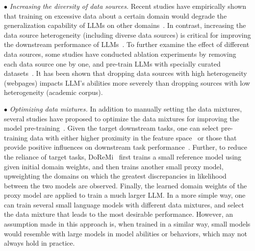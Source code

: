 {{$\bullet$ \emph{Increasing the diversity of data sources.}
Recent studies have empirically shown that training on excessive data about a certain domain would degrade the generalization capability of LLMs on other domains~\cite{Taylor-arxiv-2022-Galactica,Rae-arxiv-2021-Scaling}. In contrast, increasing the data source heterogeneity (\eg  including diverse data sources) is critical for improving the downstream performance of LLMs~\cite{Longpre-arxiv-2023-pretrainer,Tirumala-2023-arXiv-D4,Shen-2023-arXiv-SlimPajamaDC}. 
To further examine the effect of different data sources, some studies  have conducted ablation experiments by removing  each data source one by one,  and pre-train LLMs with specially curated datasets~\cite{Longpre-arxiv-2023-pretrainer}. It has been shown  that dropping data sources with high heterogeneity (\eg webpages) impacts LLM's abilities more severely than dropping sources with low heterogeneity (\eg academic corpus).
}

{$\bullet$ \emph{Optimizing data mixtures.}
In addition to manually setting the data mixtures, several studies have proposed to optimize the data mixtures for improving the model pre-training~\cite{Xie-arxiv-2023-DSIR,Xie-arxiv-2023-doremi}. Given the target downstream tasks, one can select pre-training data with either higher proximity in the feature space~\cite{Xie-arxiv-2023-DSIR} or those that provide positive influences on downstream  task performance~\cite{Wang-2023-arXiv-farewell}. %
Further, to reduce the reliance of target tasks, DoReMi~\cite{Xie-arxiv-2023-doremi} %
 first trains a small reference model using   given initial domain weights, and then trains another small proxy model, upweighting the domains   on which the greatest discrepancies in  likelihood between the two models are observed. Finally, the learned  domain weights of the proxy model are applied to train a much larger LLM.} 
In a more simple way, one can train several small  language models with different data mixtures, and select the data mixture that leads to  the most desirable performance.
However, an assumption made in this  approach is,   when trained in a similar way,  small models would resemble with large models in model abilities or behaviors, which may not always hold in practice. 
}

